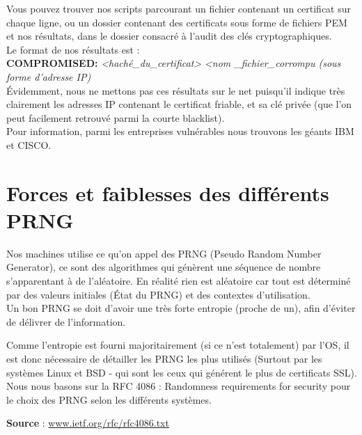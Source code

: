 \documentclass{article}
\begin{document}
	Vous pouvez trouver nos scripts parcourant un fichier contenant un 
	certificat sur chaque ligne, ou un dossier contenant des certificats sous 
	forme de fichiers PEM et nos résultats, dans le dossier consacré à l'audit des clés
	cryptographiques.\\

	Le format de nos résultats est : \\
	
	\textbf{COMPROMISED:} \textit{<haché\_du\_certificat>} \textit{<nom
	\_fichier\_corrompu (sous forme d'adresse IP)}\\

	Évidemment, nous ne mettons pas ces résultats sur le net puisqu'il indique 
	très clairement les adresses IP contenant le certificat friable, et sa clé
	privée (que l'on peut facilement retrouvé parmi la courte blacklist).\\

	Pour information, parmi les entreprises vulnérables nous trouvons les géants
	IBM et CISCO.

	\newpage







\section{Forces et faiblesses des différents PRNG}

	Nos machines utilise ce qu'on appel des PRNG (Pseudo Random Number Generator), 
	ce sont des algorithmes qui génèrent une séquence de nombre s'apparentant
	à de l'aléatoire. En réalité rien est aléatoire car tout est déterminé par
	des valeurs initiales (État du PRNG) et des contextes d'utilisation.\\
	
	Un bon PRNG se doit d'avoir une très forte entropie (proche de un), afin
	d'éviter de délivrer de l'information.

	Comme l'entropie est fourni majoritairement (si ce n'est totalement) par 
	l'OS, il est donc nécessaire de détailler les PRNG les plus utilisés
	(Surtout par les systèmes Linux et BSD - qui sont les ceux qui générent le
	plus de certificats SSL).\\

	Nous nous basons sur la RFC 4086 : Randomness requirements for security
	pour le choix des PRNG selon les différents	systèmes.
	
	\textbf{Source} :
	\href{http://www.ietf.org/rfc/rfc4086.txt}{www.ietf.org/rfc/rfc4086.txt}
\end{document}
